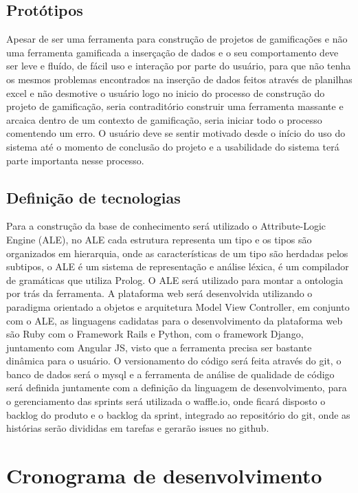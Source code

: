 \subsection{Protótipos}

Apesar de ser uma ferramenta para construção de projetos de gamificações e não uma ferramenta gamificada a inserçação de dados e o seu comportamento deve ser leve e fluído, de fácil uso  e interação por parte do usuário, para que não tenha os mesmos problemas encontrados na inserção de dados feitos através de planilhas excel e não desmotive o usuário logo no inicio do processo de construção do projeto de gamificação, seria contraditório construir uma ferramenta massante e arcaica dentro de um contexto de gamificação, seria iniciar todo o processo comentendo um erro. O usuário deve se sentir motivado desde o início do uso do sistema até o momento de conclusão do projeto e a usabilidade do sistema terá parte importanta nesse processo.



	
\subsection{Definição de tecnologias}

Para a construção da base de conhecimento será utilizado o Attribute-Logic Engine (ALE), no ALE cada estrutura representa um tipo e os tipos são organizados em hierarquia, onde as características de um tipo são herdadas pelos subtipos, o ALE é um sistema de representação e análise léxica, é um compilador de gramáticas que utiliza Prolog. O ALE será utilizado para montar a ontologia por trás da ferramenta.
A plataforma web será desenvolvida utilizando o paradigma orientado a objetos e arquitetura Model View Controller, em conjunto com o ALE, as linguagens cadidatas para o desenvolvimento da plataforma web são Ruby com o Framework Rails e Python, com o framework Django, juntamento com Angular JS, visto que a ferramenta precisa ser bastante dinâmica para o usuário. O versionamento do código será feita através do git, o banco de dados será o mysql e a ferramenta de análise de qualidade de código será definida juntamente com a definição da linguagem de desenvolvimento, para o gerenciamento das sprints será utilizada o waffle.io, onde ficará disposto o backlog do produto e o backlog da sprint, integrado ao repositório do git, onde as histórias serão divididas em tarefas e gerarão issues no github.
\newpage

\section{Cronograma de desenvolvimento}


